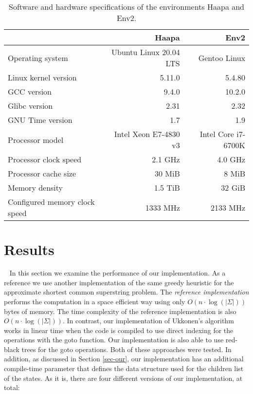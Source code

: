 \documentclass[english,twoside,censored,csm,algorithms-track-2020]{HYthesisML}
\theoremstyle{plain}
\theoremstyle{definition}
\begin{document}
\begin{table}
\begin{tabular}{l|r|r}
  & \textbf{Haapa} & \textbf{Env2} \\
  \hline
  Operating system & Ubuntu Linux 20.04 LTS & Gentoo Linux \footnotemark \\
  Linux kernel version & 5.11.0 & 5.4.80 \\
  GCC version & 9.4.0 & 10.2.0 \\
  Glibc version & 2.31 & 2.32 \\
  GNU Time version & 1.7 & 1.9 \\
  \hline
  Processor model & Intel Xeon E7-4830 v3 & Intel Core i7-6700K \\
  Processor clock speed & 2.1 GHz & 4.0 GHz \\
  Processor cache size & 30 MiB & 8 MiB \\
  Memory density & 1.5 TiB & 32 GiB \\
  Configured memory clock speed & 1333 MHz & 2133 MHz \\
\end{tabular}
\caption{Software and hardware specifications of the environments Haapa and Env2.}
\label{tbl-sys}
\end{table}




\section{Results}~\label{sec-results}
In this section we examine the performance of our implementation. As a reference we use another
implementation of the same greedy heuristic for the approximate shortest common superstring problem.
The {\em reference implementation} \citep{Alanko17} performs the computation in a space efficient way using
only $O(n \cdot\log(|\Sigma|))$ bytes of memory. The time complexity of the reference implementation
is also $O(n \cdot\log(|\Sigma|))$. In contrast, our implementation of Ukkonen's algorithm
works in linear time when the code is compiled to use direct indexing for the operations with
the goto function. Our implementation is also able to use red-black trees for the goto
operations. Both of these approaches were tested.
In addition, as discussed in Section
\ref{sec-our}, our implementation has an additional compile-time parameter that defines the data
structure used for the children list of the states. As it is, there are four different versions of
our implementation, at total:
\end{document}
